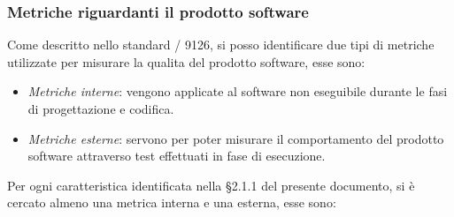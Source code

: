     \subsubsection{Metriche riguardanti il prodotto software}
    Come descritto nello standard / 9126, si posso identificare due tipi di metriche utilizzate per misurare la qualita del prodotto software, esse sono:
    \begin{itemize}
      \item \emph{Metriche interne}: vengono applicate al software non eseguibile durante le fasi di progettazione e codifica.
      \item \emph{Metriche esterne}: servono per poter misurare il comportamento del prodotto software attraverso test effettuati in fase di esecuzione.
    \end{itemize}
    Per ogni caratteristica identificata nella \S2.1.1 del presente documento, si è cercato almeno una metrica interna e una esterna, esse sono:
